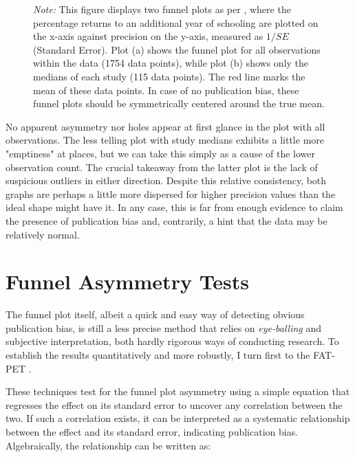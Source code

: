 \begin{figure}[!t]
\begin{center}
\begin{subfigure}[b]{0.45\textwidth}
   \label{fig:funnel_plot_medians}
\end{subfigure}
\end{center}\vspace{-0.6cm}
\captionsetup{width=0.85\textwidth, font = scriptsize}
\caption*{\emph{Note:} This figure displays two funnel plots as per \cite{Egger1997}, where the percentage returns to an additional year of schooling are plotted on the x-axis against precision on the y-axis, measured as $1/SE$ (Standard Error). Plot (a) shows the funnel plot for all observations within the data (1754 data points), while plot (b) shows only the medians of each study (115 data points). The red line marks the mean of these data points. In case of no publication bias, these funnel plots should be symmetrically centered around the true mean.}
\end{figure}

No apparent asymmetry nor holes appear at first glance in the plot with all observations. The less telling plot with study medians exhibits a little more "emptiness" at places, but we can take this simply as a cause of the lower observation count. The crucial takeaway from the latter plot is the lack of suspicious outliers in either direction. Despite this relative consistency, both graphs are perhaps a little more dispersed for higher precision values than the ideal shape might have it. In any case, this is far from enough evidence to claim the presence of publication bias and, contrarily, a hint that the data may be relatively normal.


\section{Funnel Asymmetry Tests}
\label{sec:linear_tests}


The funnel plot itself, albeit a quick and easy way of detecting obvious publication bias, is still a less precise method that relies on \textit{eye-balling} and subjective interpretation, both hardly rigorous ways of conducting research. To establish the results quantitatively and more robustly, I turn first to the \ac{FAT-PET} \citep{Egger1997, stanley2005beyond, stanley2008fatpet}.

These techniques test for the funnel plot asymmetry using a simple equation that regresses the effect on its standard error to uncover any correlation between the two. If such a correlation exists, it can be interpreted as a systematic relationship between the effect and its standard error, indicating publication bias. Algebraically, the relationship can be written as:

